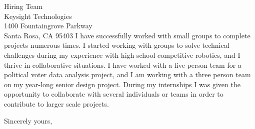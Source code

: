 \documentclass[11pt]{letter}
\def \theirname {Hiring Team}
\begin{document}
\begin{letter}{\theirname \\
Keysight Technologies \\
1400 Fountaingrove Parkway \\
Santa Rosa, CA 95403
}
I have successfully worked with small groups to complete projects numerous times. I started working with groups to solve technical challenges during my experience with high school competitive robotics, and I thrive in collaborative situations. I have worked with a five person team for a political voter data analysis project, and I am working with a three person team on my year-long senior design project. During my internships I was given the opportunity to collaborate with several individuals or teams in order to contribute to larger scale projects.





\closing{Sincerely yours,}




\end{letter}
\end{document}
